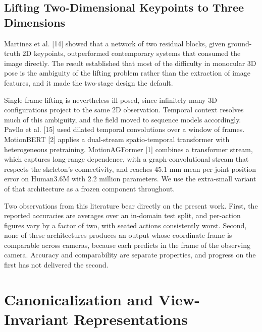 \documentclass[12pt,a4paper]{report}
\begin{document}
\subsection{Lifting Two-Dimensional Keypoints to Three Dimensions}

Martinez et al. [14] showed that a network of two residual blocks, given ground-truth 2D keypoints, outperformed contemporary systems that consumed the image directly. The result established that most of the difficulty in monocular 3D pose is the ambiguity of the lifting problem rather than the extraction of image features, and it made the two-stage design the default.

Single-frame lifting is nevertheless ill-posed, since infinitely many 3D configurations project to the same 2D observation. Temporal context resolves much of this ambiguity, and the field moved to sequence models accordingly. Pavllo et al. [15] used dilated temporal convolutions over a window of frames. MotionBERT [2] applies a dual-stream spatio-temporal transformer with heterogeneous pretraining. MotionAGFormer [1] combines a transformer stream, which captures long-range dependence, with a graph-convolutional stream that respects the skeleton's connectivity, and reaches 45.1 mm mean per-joint position error on Human3.6M with 2.2 million parameters. We use the extra-small variant of that architecture as a frozen component throughout.

Two observations from this literature bear directly on the present work. First, the reported accuracies are averages over an in-domain test split, and per-action figures vary by a factor of two, with seated actions consistently worst. Second, none of these architectures produces an output whose coordinate frame is comparable across cameras, because each predicts in the frame of the observing camera. Accuracy and comparability are separate properties, and progress on the first has not delivered the second.

\section{Canonicalization and View-Invariant Representations}
\end{document}
